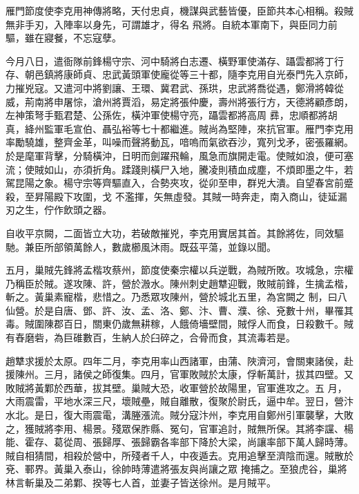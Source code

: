 \begin{pinyinscope}
 雁門節度使李克用神傳將略，天付忠貞，機謀與武藝皆優，臣節共本心相稱。殺賊無非手刃，入陣率以身先，可謂雄才，得名
 飛將。自統本軍南下，與臣同力前驅，雖在寢餐，不忘寇孽。



 今月八日，遣衙隊前鋒楊守宗、河中騎將白志遷、橫野軍使滿存、躡雲都將丁行存、朝邑鎮將康師貞、忠武黃頭軍使龐從等三十都，隨李克用自光泰門先入京師，力摧兇寇。又遣河中將劉讓、王環、冀君武、孫珙，忠武將喬從遇，鄭滑將韓從威，荊南將申屠悰，滄州將賈滔，易定將張仲慶，壽州將張行方，天德將顧彥朗，左神策弩手甄君楚、公孫佐，橫沖軍使楊守亮，躡雲都將高周
 彞，忠順都將胡真，絳州監軍毛宣伯、聶弘裕等七十都繼進。賊尚為堅陣，來抗官軍。雁門李克用率勵驍雄，整齊金革，叫噪而聲將動瓦，喑嗚而氣欲吞沙，寬列戈矛，密張羅網。於是麾軍背擊，分騎橫沖，日明而劍躍飛輪，風急而旗開走電。使賊如浪，便可塞流；使賊如山，亦須折角。蹂踐則橫尸入地，騰凌則積血成塵，不煩即墨之牛，若駕昆陽之象。楊守宗等齊驅直入，合勢夾攻，從卯至申，群兇大潰。自望春宮前蹙殺，至昇陽殿下攻圍，戈
 不濫揮，矢無虛發。其賊一時奔走，南入商山，徒延漏刃之生，佇作飲頭之器。



 自收平京闕，二面皆立大功，若破敵摧兇，李克用實居其首。其餘將佐，同效驅馳。兼臣所部領萬餘人，數歲櫛風沐雨。既茲平蕩，並錄以聞。



 五月，巢賊先鋒將孟楷攻蔡州，節度使秦宗權以兵逆戰，為賊所敗。攻城急，宗權乃稱臣於賊。遂攻陳、許，營於溵水。陳州刺史趙犨迎戰，敗賊前鋒，生擒孟楷，斬之。黃巢素寵楷，悲惜之。乃悉眾攻陳州，營於城北五里，為宮闕之
 制，曰八仙營。於是自唐、鄧、許、汝、孟、洛、鄭、汴、曹、濮、徐、兗數十州，畢罹其毒。賊圍陳郡百日，關東仍歲無耕稼，人餓倚墻壁間，賊俘人而食，日殺數千。賊有舂磨砦，為巨碓數百，生納人於臼碎之，合骨而食，其流毒若是。



 趙犨求援於太原。四年二月，李克用率山西諸軍，由蒲、陜濟河，會關東諸侯，赴援陳州。三月，諸侯之師復集。四月，官軍敗賊於太康，俘斬萬計，拔其四壁。又敗賊將黃鄴於西華，拔其壁。巢賊大恐，收軍營於故陽里，官軍進攻之。五
 月，大雨震雷，平地水深三尺，壞賊壘，賊自離散，復聚於尉氏，逼中牟。翌日，營汴水北。是日，復大雨震電，溝塍漲流。賊分寇汴州，李克用自鄭州引軍襲擊，大敗之，獲賊將李用、楊景。殘眾保胙縣、冤句，官軍追討，賊無所保。其將李讜、楊能、霍存、葛從周、張歸厚、張歸霸各率部下降於大梁，尚讓率部下萬人歸時薄。賊自相猜間，相殺於營中，所殘者千人，中夜遁去。克用追擊至濟陰而還。賊散於兗、鄆界。黃巢入泰山，徐帥時薄遣將張友與尚讓之眾
 掩捕之。至狼虎谷，巢將林言斬巢及二弟鄴、揆等七人首，並妻子皆送徐州。是月賊平。




\end{pinyinscope}
